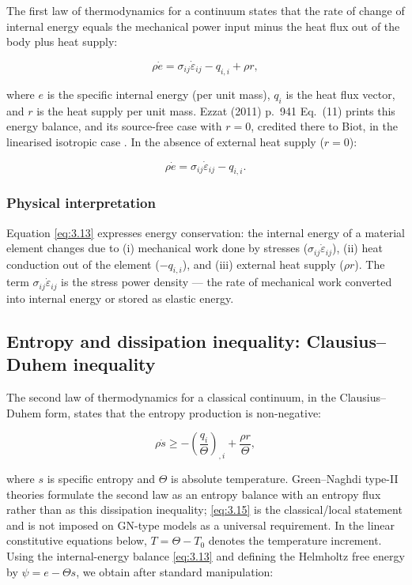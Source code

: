 The first law of thermodynamics for a continuum states that the rate of change of internal energy equals the mechanical power input minus the heat flux out of the body plus heat supply:

\begin{equation}
\rho \dot{e} = \sigma_{ij}\dot{\varepsilon}_{ij} - q_{i,i} + \rho r,
\label{eq:3.13}
\end{equation}

where $e$ is the specific internal energy (per unit mass), $q_i$ is the heat flux vector, and $r$ is the heat supply per unit mass. Ezzat (2011) p.~941 Eq.~(11) prints this energy balance, and its source-free case with $r=0$, credited there to Biot, in the linearised isotropic case \cite{Ezzat2011}. In the absence of external heat supply ($r = 0$):

\begin{equation}
\rho \dot{e} = \sigma_{ij}\dot{\varepsilon}_{ij} - q_{i,i}.
\label{eq:3.14}
\end{equation}

\subsubsection{Physical interpretation}
Equation \eqref{eq:3.13} expresses energy conservation: the internal energy of a material element changes due to (i) mechanical work done by stresses ($\sigma_{ij}\dot{\varepsilon}_{ij}$), (ii) heat conduction out of the element ($-q_{i,i}$), and (iii) external heat supply ($\rho r$). The term $\sigma_{ij}\dot{\varepsilon}_{ij}$ is the stress power density — the rate of mechanical work converted into internal energy or stored as elastic energy.

\subsection{Entropy and dissipation inequality: Clausius--Duhem inequality}
\label{sec:3.4}

The second law of thermodynamics for a classical continuum, in the Clausius--Duhem form, states that the entropy production is non-negative:

\begin{equation}
\rho \dot{s} \geq -\left(\frac{q_i}{\Theta}\right)_{,i} + \frac{\rho r}{\Theta},
\label{eq:3.15}
\end{equation}

where $s$ is specific entropy and $\Theta$ is absolute temperature. Green--Naghdi type-II theories formulate the second law as an entropy balance with an entropy flux rather than as this dissipation inequality; \eqref{eq:3.15} is the classical/local statement and is not imposed on GN-type models as a universal requirement. In the linear constitutive equations below, $T=\Theta-T_0$ denotes the temperature increment. Using the internal-energy balance \eqref{eq:3.13} and defining the Helmholtz free energy by $\psi=e-\Theta s$, we obtain after standard manipulation:

